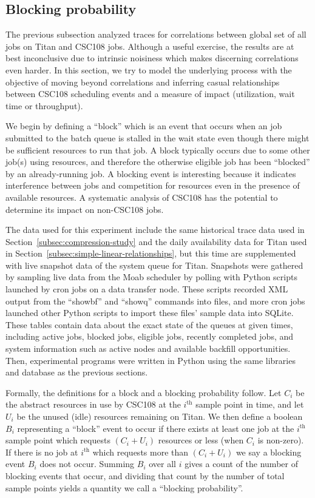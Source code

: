 \subsection{Blocking probability}
\label{subsec:blocking-probability}

The previous subsection analyzed traces for correlations between global set of
all jobs on Titan and CSC108 jobs. Although a useful exercise, the results are
at best inconclusive due to intrinsic noisiness which makes discerning
correlations even harder. In this section, we  try to model the underlying
process with the objective of moving beyond correlations and inferring casual
relationships between CSC108 scheduling events and a measure of impact
(utilization, wait time or throughput).

We begin by defining a ``block'' which is an event that occurs when an job
submitted to the batch queue is stalled in the wait state even though there
might be sufficient resources to run that job. A block typically occurs due to
some other job(s) using resources, and therefore the otherwise eligible job
has been ``blocked'' by an already-running job. A blocking event is
interesting because it indicates interference between jobs and competition for
resources even in the presence of available resources. A systematic analysis
of CSC108 has the potential to determine its impact on non-CSC108 jobs.

The data used for this experiment include the same historical trace data used
in Section~\ref{subsec:compression-study} and the daily availability
data for Titan used in Section~\ref{subsec:simple-linear-relationships}, but
this time are supplemented with live snapshot data of the system queue for
Titan. Snapshots were gathered by sampling live data from the Moab scheduler by
polling with Python scripts launched by cron jobs on a data transfer node.
These scripts recorded XML output from the ``showbf'' and ``showq'' commands
into files, and more cron jobs launched other Python scripts to import these
files' sample data into SQLite. These tables contain data about the exact state
of the queues at given times, including active jobs, blocked jobs, eligible
jobs, recently completed jobs, and system information such as active nodes and
available backfill opportunities. Then, experimental programs were written in
Python using the same libraries and database as the previous sections.

Formally, the definitions for a block and a blocking probability follow. Let
$C_i$ be the abstract resources in use by CSC108 at the $i^{\text{th}}$ sample
point in time, and let $U_i$ be the unused (idle) resources remaining on
Titan. We then define a boolean $B_i$ representing a ``block'' event to occur
if there exists at least one job at the $i^{\text{th}}$ sample point which
requests $(C_i + U_i)$ resources or less (when $C_i$ is non-zero). If there is
no job at $i^{\text{th}}$ which requests more than $(C_i + U_i)$ we say a
blocking event $B_i$  does not occur. Summing $B_i$ over all $i$ gives a count
of the number of blocking events that occur, and dividing that count by the
number of total sample points yields a quantity we call a ``blocking
probability''.

